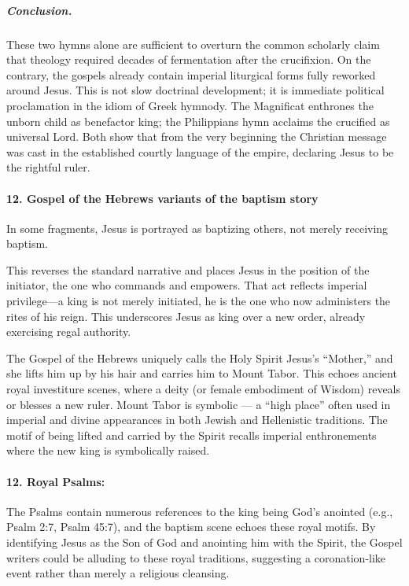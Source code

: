 \subparagraph{Conclusion.}
These two hymns alone are sufficient to overturn the common scholarly claim that theology required decades of fermentation after the crucifixion.
On the contrary, the gospels already contain imperial liturgical forms fully reworked around Jesus.
This is not slow doctrinal development; it is immediate political proclamation in the idiom of Greek hymnody.
The Magnificat enthrones the unborn child as benefactor king; the Philippians hymn acclaims the crucified as universal Lord.
Both show that from the very beginning the Christian message was cast in the established courtly language of the empire, declaring Jesus to be the rightful ruler.


\paragraph{12.
Gospel of the Hebrews variants of the baptism story}\label{par:gospel-of-the-hebrews-variants-of-the-baptism-story}

In some fragments, Jesus is portrayed as baptizing others, not merely receiving baptism.

This reverses the standard narrative and places Jesus in the position of the initiator, the one who commands and empowers.
That act reflects imperial privilege---a king is not merely initiated, he is the one who now administers the rites of his reign.
This underscores Jesus as king over a new order, already exercising regal authority.

The Gospel of the Hebrews uniquely calls the Holy Spirit Jesus's ``Mother,'' and she lifts him up by his hair and carries him to Mount Tabor.
This echoes ancient royal investiture scenes, where a deity (or female embodiment of Wisdom) reveals or blesses a new ruler.
Mount Tabor is symbolic --- a ``high place'' often used in imperial and divine appearances in both Jewish and Hellenistic traditions.
The motif of being lifted and carried by the Spirit recalls imperial enthronements where the new king is symbolically raised.

\paragraph{12.
Royal Psalms:}\label{par:royal-psalms}

The Psalms contain numerous references to the king being God's anointed (e.g., Psalm 2:7, Psalm 45:7), and the baptism scene echoes these royal motifs.
By identifying Jesus as the Son of God and anointing him with the Spirit, the Gospel writers could be alluding to these royal traditions, suggesting a coronation-like event rather than merely a religious cleansing.


